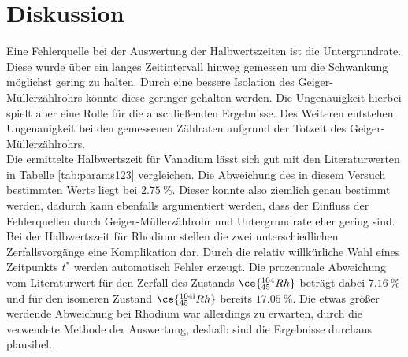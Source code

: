 \section{Diskussion}

Eine Fehlerquelle bei der Auswertung der Halbwertszeiten ist die Untergrundrate. Diese wurde über ein langes Zeitintervall hinweg gemessen um die
Schwankung möglichst gering zu halten. Durch eine bessere Isolation des Geiger-Müllerzählrohrs könnte diese geringer gehalten werden.
Die Ungenauigkeit hierbei spielt aber eine Rolle für die anschließenden Ergebnisse. Des Weiteren entstehen Ungenauigkeit bei
den gemessenen Zählraten aufgrund der Totzeit des Geiger-Müllerzählrohrs. 
\\
\newline
Die ermittelte Halbwertszeit für Vanadium lässt sich gut mit den Literaturwerten in Tabelle \ref{tab:params123} vergleichen. Die Abweichung des in diesem Versuch bestimmten Werts 
liegt bei $\SI{2.75}{\percent}$. Dieser konnte also ziemlich genau bestimmt werden, dadurch kann ebenfalls argumentiert werden, dass der Einfluss der Fehlerquellen
durch Geiger-Müllerzählrohr und Untergrundrate eher gering sind.
\\
\newline
Bei der Halbwertszeit für Rhodium stellen die zwei unterschiedlichen Zerfallsvorgänge eine Komplikation dar. Durch die relativ willkürliche Wahl eines Zeitpunkts $t^{*}$ werden
automatisch Fehler erzeugt. Die prozentuale Abweichung vom Literaturwert für den Zerfall des Zustands $\ce{^{104}_{45}Rh}$ beträgt dabei $\SI{7.16}{\percent}$ und für den 
isomeren Zustand $\ce{^{104{\text{i}}}_{45}Rh}$ bereits $\SI{17.05}{\percent}$. 
Die etwas größer werdende Abweichung bei Rhodium war allerdings zu erwarten, durch die verwendete Methode der Auswertung, deshalb sind die Ergebnisse durchaus plausibel.
